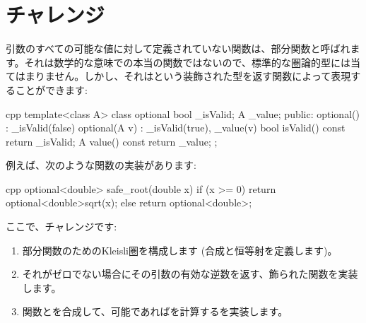 \section{チャレンジ}

引数のすべての可能な値に対して定義されていない関数は、部分関数と呼ばれます。それは数学的な意味での本当の関数ではないので、標準的な圏論的型には当てはまりません。しかし、それはという装飾された型を返す関数によって表現することができます:

\begin{snip}{cpp}
template<class A> class optional {
    bool _isValid;
    A _value;
public: 
    optional()    : _isValid(false) {}
    optional(A v) : _isValid(true), _value(v) {}
    bool isValid() const { return _isValid; }
    A value() const { return _value; }
};
\end{snip}
例えば、次のような関数の実装があります:

\begin{snip}{cpp}
optional<double> safe_root(double x) {
    if (x >= 0) return optional<double>{sqrt(x)}; 
    else return optional<double>{};
}
\end{snip}
ここで、チャレンジです:

\begin{enumerate}
  \tightlist
  \item
        部分関数のためのKleisli圏を構成します (合成と恒等射を定義します)。
  \item
        それがゼロでない場合にその引数の有効な逆数を返す、飾られた関数を実装します。
  \item
        関数とを合成して、可能であればを計算するを実装します。
\end{enumerate}